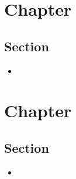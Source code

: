 \documentclass[12pt,a4paper]{article}
\begin{document}
\section{Chapter}
\subsection{Section}
\begin{itemize}
    \item 
\end{itemize}

\clearpage
\section{Chapter}
\subsection{Section}
\begin{itemize}
    \item 
\end{itemize}
\end{document}
